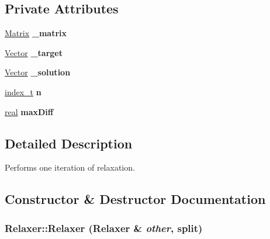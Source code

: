 \subsection*{Private Attributes}
\begin{CompactItemize}
\item 
\hypertarget{class_relaxer_9055aba4c4a03387dd8809c3ab4a0629}{
\hyperlink{cowichan_8hpp_3fb46f939e55c239fbc95656fc0f3399}{Matrix} \textbf{\_\-matrix}}
\label{class_relaxer_9055aba4c4a03387dd8809c3ab4a0629}

\item 
\hypertarget{class_relaxer_352fb652b751f1df458ee2922fe6031f}{
\hyperlink{cowichan_8hpp_02bc1553e241b9b33408482658b3c355}{Vector} \textbf{\_\-target}}
\label{class_relaxer_352fb652b751f1df458ee2922fe6031f}

\item 
\hypertarget{class_relaxer_2c9cfda63081510022de66b90545382b}{
\hyperlink{cowichan_8hpp_02bc1553e241b9b33408482658b3c355}{Vector} \textbf{\_\-solution}}
\label{class_relaxer_2c9cfda63081510022de66b90545382b}

\item 
\hypertarget{class_relaxer_e5482dd547d0e30ab75a0d678ab0a6a7}{
\hyperlink{cowichan_8hpp_5b04577d5d21124855deaad298595371}{index\_\-t} \textbf{n}}
\label{class_relaxer_e5482dd547d0e30ab75a0d678ab0a6a7}

\item 
\hypertarget{class_relaxer_8ea0071b5726e7a21f2cf33637ba8d00}{
\hyperlink{cowichan_8hpp_4d521b2c54a1f6312cc8fa04827eaf98}{real} \textbf{maxDiff}}
\label{class_relaxer_8ea0071b5726e7a21f2cf33637ba8d00}

\end{CompactItemize}


\subsection{Detailed Description}
Performs one iteration of relaxation. 

\subsection{Constructor \& Destructor Documentation}
\hypertarget{class_relaxer_34cd0a0220031f4ec6ab21dbcf9a9970}{
\subsubsection[{Relaxer}]{\setlength{\rightskip}{0pt plus 5cm}Relaxer::Relaxer ({\bf Relaxer} \& {\em other}, \/  split)}}
\label{class_relaxer_34cd0a0220031f4ec6ab21dbcf9a9970}


